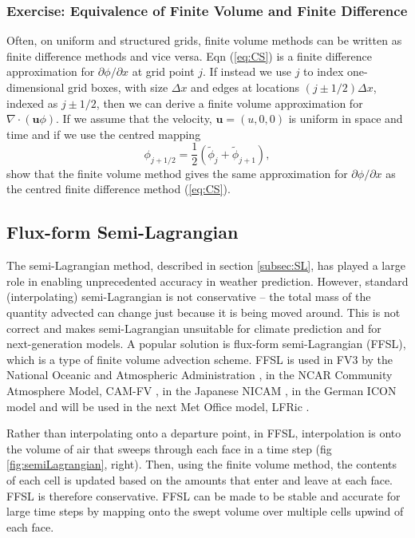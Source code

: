 \subsubsection{Exercise: Equivalence of Finite Volume and Finite Difference}

Often, on uniform and structured grids, finite volume methods can
be written as finite difference methods and vice versa. Eqn (\ref{eq:CS})
is a finite difference approximation for $\partial\phi/\partial x$
at grid point $j$. If instead we use $j$ to index one-dimensional
grid boxes, with size $\Delta x$ and edges at locations $\left(j\pm1/2\right)\Delta x$,
indexed as $j\pm1/2$, then we can derive a finite volume approximation
for $\nabla\cdot\left(\mathbf{u}\phi\right)$. If we assume that the
velocity, $\mathbf{u}=(u,0,0)$ is uniform in space and time and if
we use the centred mapping
\begin{equation}
\phi_{j+1/2}=\frac{1}{2}\left(\tilde{\phi}_{j}+\tilde{\phi}_{j+1}\right),
\end{equation}
show that the finite volume method gives the same approximation for
$\partial\phi/\partial x$ as the centred finite difference method
(\ref{eq:CS}).

\subsection{Flux-form Semi-Lagrangian}\label{subsec:FFSL}

The semi-Lagrangian method, described in section \ref{subsec:SL},
has played a large role in enabling unprecedented accuracy in weather
prediction. However, standard (interpolating) semi-Lagrangian is not
conservative -- the total mass of the quantity advected can change
just because it is being moved around. This is not correct and makes
semi-Lagrangian unsuitable for climate prediction and for next-generation
models. A popular solution is flux-form semi-Lagrangian (FFSL), which
is a type of finite volume advection scheme. FFSL is used in FV3 by
the National Oceanic and Atmospheric Administration \citep[NOAA,][]{HCP+21},
in the NCAR Community Atmosphere Model, CAM-FV \citep{NRC+10}, in
the Japanese NICAM \citep{Miu07b}, in the German ICON model \citep{ZRR+15,ICON26}
and will be used in the next Met Office model, LFRic \citep{BK25}. 

Rather than interpolating onto a departure point, in FFSL, interpolation
is onto the volume of air that sweeps through each face in a time
step (fig \ref{fig:semiLagrangian}, right). Then, using the finite
volume method, the contents of each cell is updated based on the amounts
that enter and leave at each face. FFSL is therefore conservative.
FFSL can be made to be stable and accurate for large time steps by
mapping onto the swept volume over multiple cells upwind of each face. 

